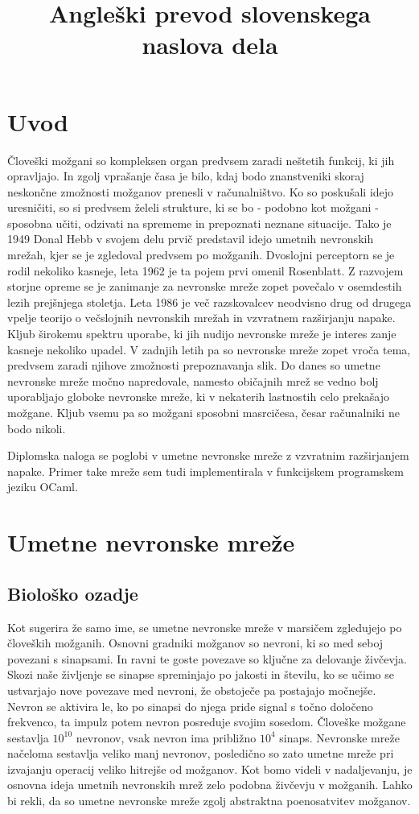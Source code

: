 \documentclass[mat1]{fmfdelo}
\title{Angleški prevod slovenskega naslova dela}
\begin{document}
\section{Uvod}

Človeški možgani so kompleksen organ predvsem zaradi neštetih funkcij, ki jih opravljajo. In zgolj vprašanje časa je bilo, kdaj bodo znanstveniki skoraj neskončne zmožnosti možganov prenesli v računalništvo. Ko so poskušali idejo uresničiti, so si predvsem želeli strukture, ki se bo - podobno kot možgani - sposobna učiti, odzivati na sprememe in prepoznati neznane situacije. Tako je 1949 Donal Hebb v svojem delu prvič predstavil idejo umetnih nevronskih mrežah, kjer se je zgledoval predvsem po možganih. Dvoslojni perceptorn se je rodil nekoliko kasneje, leta 1962 je ta pojem prvi omenil Rosenblatt. Z razvojem storjne opreme se je zanimanje za nevronske mreže zopet povečalo v osemdestih lezih prejšnjega stoletja. Leta 1986 je več razskovalcev neodvisno drug od drugega vpelje teorijo o večslojnih nevronskih mrežah in vzvratnem razširjanju napake. Kljub širokemu spektru uporabe, ki jih nudijo nevronske mreže je interes zanje kasneje nekoliko upadel. V zadnjih letih pa so nevronske mreže zopet vroča tema, predvsem zaradi njihove zmožnosti prepoznavanja slik. Do danes so umetne nevronske mreže močno napredovale, namesto običajnih mrež se vedno bolj uporabljajo globoke nevronske mreže, ki v nekaterih lastnostih celo prekašajo možgane. Kljub vsemu pa so možgani sposobni masrcičesa, česar računalniki ne bodo nikoli.

Diplomska naloga se poglobi v umetne nevronske mreže z vzvratnim razširjanjem napake. Primer take mreže sem tudi implementirala v funkcijskem programskem jeziku OCaml. 

\section{Umetne nevronske mreže}

\subsection{Biološko ozadje}
Kot sugerira že samo ime, se umetne nevronske mreže v marsičem zgledujejo po človeških možganih. Osnovni gradniki možganov so nevroni, ki so med seboj povezani s sinapsami. In ravni te goste povezave so ključne za delovanje živčevja. Skozi naše življenje se sinapse spreminjajo po jakosti in številu, ko se učimo se ustvarjajo nove povezave med nevroni, že obstoječe pa postajajo močnejše. Nevron se aktivira le,  ko po sinapsi do njega pride signal s točno določeno frekvenco, ta impulz potem nevron posreduje svojim sosedom. Človeške možgane sestavlja $10^{10}$ nevronov, vsak nevron ima približno $10^4$ sinaps. Nevronske mreže načeloma sestavlja veliko manj nevronov, posledično so zato umetne mreže pri izvajanju operacij veliko hitrejše od možganov. Kot bomo videli v nadaljevanju, je osnovna ideja umetnih nevronskih mrež zelo podobna živčevju v možganih. Lahko bi rekli, da so umetne nevronske mreže zgolj abstraktna poenosatvitev možganov. 
\end{document}
